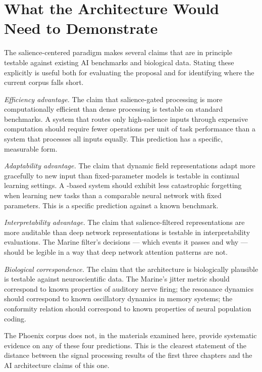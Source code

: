 \section{What the Architecture Would Need to Demonstrate}
\label{sec:architecture-needs}

The salience-centered paradigm makes several claims that are
in principle testable against existing AI benchmarks and
biological data. Stating these explicitly is useful both
for evaluating the proposal and for identifying where the
current corpus falls short.

\textit{Efficiency advantage.} The claim that salience-gated
processing is more computationally efficient than dense
processing is testable on standard benchmarks. A system
that routes only high-salience inputs through expensive
computation should require fewer operations per unit of
task performance than a system that processes all inputs
equally. This prediction has a specific, measurable form.

\textit{Adaptability advantage.} The claim that dynamic
field representations adapt more gracefully to new input
than fixed-parameter models is testable in continual
learning settings. A \MEMeight{}-based system should
exhibit less catastrophic forgetting when learning new
tasks than a comparable neural network with fixed parameters.
This is a specific prediction against a known benchmark.

\textit{Interpretability advantage.} The claim that
salience-filtered representations are more auditable than
deep network representations is testable in
interpretability evaluations. The Marine filter's decisions
--- which events it passes and why --- should be legible
in a way that deep network attention patterns are not.

\textit{Biological correspondence.} The claim that the
architecture is biologically plausible is testable against
neuroscientific data. The Marine's jitter metric should
correspond to known properties of auditory nerve firing;
the \MEMeight{} resonance dynamics should correspond to
known oscillatory dynamics in memory systems; the \HCFone{}
conformity relation should correspond to known properties
of neural population coding.

The Phoenix corpus does not, in the materials examined here,
provide systematic evidence on any of these four predictions.
This is the clearest statement of the distance between the
signal processing results of the first three chapters and
the AI architecture claims of this one.

